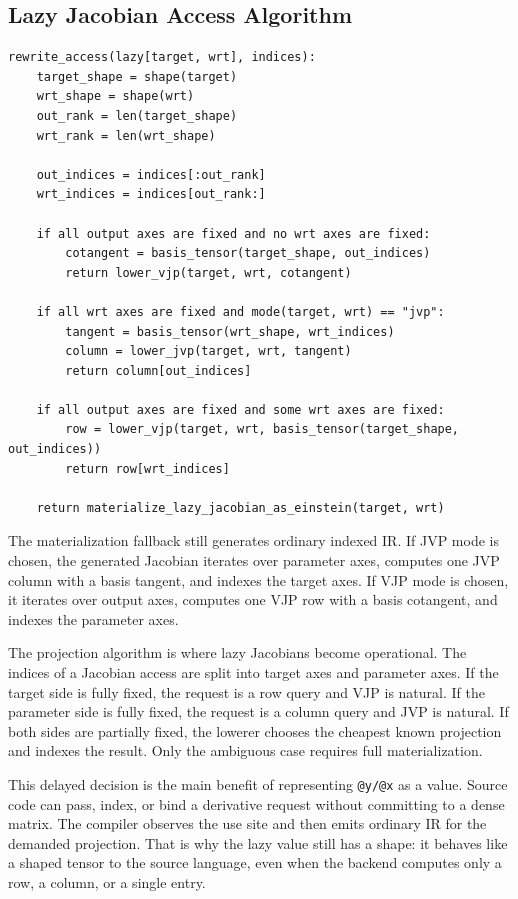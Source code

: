 \subsection{Lazy Jacobian Access Algorithm}

\begin{lstlisting}[style=pythoncode,caption={Projected lazy-Jacobian lowering.}]
rewrite_access(lazy[target, wrt], indices):
    target_shape = shape(target)
    wrt_shape = shape(wrt)
    out_rank = len(target_shape)
    wrt_rank = len(wrt_shape)

    out_indices = indices[:out_rank]
    wrt_indices = indices[out_rank:]

    if all output axes are fixed and no wrt axes are fixed:
        cotangent = basis_tensor(target_shape, out_indices)
        return lower_vjp(target, wrt, cotangent)

    if all wrt axes are fixed and mode(target, wrt) == "jvp":
        tangent = basis_tensor(wrt_shape, wrt_indices)
        column = lower_jvp(target, wrt, tangent)
        return column[out_indices]

    if all output axes are fixed and some wrt axes are fixed:
        row = lower_vjp(target, wrt, basis_tensor(target_shape, out_indices))
        return row[wrt_indices]

    return materialize_lazy_jacobian_as_einstein(target, wrt)
\end{lstlisting}

The materialization fallback still generates ordinary indexed IR. If JVP mode
is chosen, the generated Jacobian iterates over parameter axes, computes one
JVP column with a basis tangent, and indexes the target axes. If VJP mode is
chosen, it iterates over output axes, computes one VJP row with a basis
cotangent, and indexes the parameter axes.

The projection algorithm is where lazy Jacobians become operational. The
indices of a Jacobian access are split into target axes and parameter axes. If
the target side is fully fixed, the request is a row query and VJP is natural.
If the parameter side is fully fixed, the request is a column query and JVP is
natural. If both sides are partially fixed, the lowerer chooses the cheapest
known projection and indexes the result. Only the ambiguous case requires full
materialization.

This delayed decision is the main benefit of representing \texttt{@y/@x} as a
value. Source code can pass, index, or bind a derivative request without
committing to a dense matrix. The compiler observes the use site and then emits
ordinary IR for the demanded projection. That is why the lazy value still has a
shape: it behaves like a shaped tensor to the source language, even when the
backend computes only a row, a column, or a single entry.

